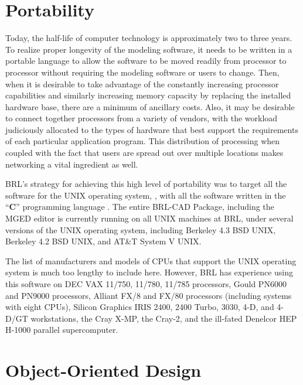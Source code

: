 \section{Portability}

Today, the half-life of computer technology is
approximately two to three years.
To realize proper longevity of the modeling software, it needs to be written
in a portable language to allow the software to be moved readily from
processor to processor without requiring the modeling software or users
to change.
Then, when it is desirable to
take advantage of the constantly increasing 
processor capabilities and similarly increasing memory capacity by replacing
the installed hardware base, there are a minimum of ancillary costs.
Also, it may be desirable to connect together processors from a variety
of vendors, with the workload judiciously allocated to
the types of hardware that best support the requirements of each particular
application program.
This distribution of processing when coupled with the fact that
users are spread out over multiple locations makes networking a vital
ingredient as well.

BRL's strategy for achieving this high level of portability was to target
all the software for the UNIX operating system,
\cite{unix-ts-sys},
with all the software written in the ``{\bf C}''
programming language \cite{c-prog-lang}.
The entire BRL-CAD Package, including the MGED editor
is currently running on all UNIX machines at BRL,
under several versions of the UNIX operating system, including
Berkeley 4.3 BSD UNIX, Berkeley 4.2 BSD UNIX, and AT\&T System V UNIX.

The list of manufacturers and models of CPUs that support the UNIX
operating system \cite{modern-tools-hi-res}
is much too lengthy to include here.  However, BRL
has experience using this software on
DEC VAX 11/750, 11/780, 11/785 processors,
Gould PN6000 and PN9000 processors,
Alliant FX/8 and FX/80 processors (including systems with eight CPUs),
Silicon Graphics IRIS 2400, 2400 Turbo, 3030, 4-D, and 4-D/GT workstations,
the Cray X-MP, the Cray-2,
and the ill-fated Denelcor HEP H-1000 parallel supercomputer.

\section{Object-Oriented Design}

